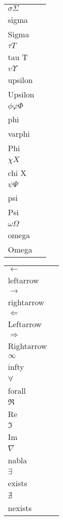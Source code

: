 \documentclass{article}
\begin{document}
\begin{multicols*}{3}
\begin{multicols*}{2}
\begin{tabularx}{\columnwidth}{lX}
        $\sigma \Sigma$ & \lstinline{\\sigma \\Sigma} \\
        $\tau T$ & \lstinline{\\tau T} \\
        $\upsilon \Upsilon$ & \lstinline{\\upsilon \\Upsilon} \\
        $\phi \varphi \Phi$ & \lstinline{\\phi \\varphi \\Phi} \\
        $\chi X$ & \lstinline{\\chi X} \\
    $\psi \Psi$ & \lstinline{\\psi \\Psi} \\
    $\omega \Omega$ & \lstinline{\\omega \\Omega} \\
\end{tabularx}
\columnbreak
\begin{tabularx}{\columnwidth}{lX}
    $\leftarrow$ & \lstinline{\\leftarrow} \\
    $\rightarrow$ & \lstinline{\\rightarrow} \\
    $\Leftarrow$ & \lstinline{\\Leftarrow} \\
    $\Rightarrow$ & \lstinline{\\Rightarrow} \\
    $\infty$ & \lstinline{\\infty} \\
    $\forall$ & \lstinline{\\forall} \\
    $\Re$ & \lstinline{\\Re} \\
    $\Im$ & \lstinline{\\Im} \\
    $\nabla$ & \lstinline{\\nabla} \\
    $\exists$ & \lstinline{\\exists} \\
    $\nexists$ & \lstinline{\\nexists} \\

\end{tabularx}
\end{multicols*}
\end{multicols*}
\end{document}
